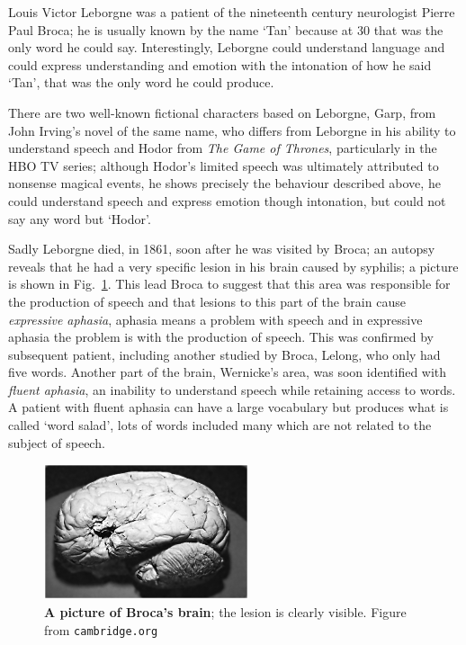\documentclass[12pt]{article}
\begin{document}
Louis Victor Leborgne was a patient of the nineteenth century
neurologist Pierre Paul Broca; he is usually known by the name `Tan'
because at 30 that was the only word he could say. Interestingly,
Leborgne could understand language and could express understanding and
emotion with the intonation of how he said `Tan', that was the only
word he could produce.

There are two well-known fictional characters based on Leborgne, Garp,
from John Irving's novel of the same name, who differs from Leborgne
in his ability to understand speech and Hodor from \textsl{The Game of
  Thrones}, particularly in the HBO TV series; although Hodor's
limited speech was ultimately attributed to nonsense magical events,
he shows precisely the behaviour described above, he could understand
speech and express emotion though intonation, but could not say any
word but `Hodor'.

Sadly Leborgne died, in 1861, soon after he was visited by Broca; an
autopsy reveals that he had a very specific lesion in his brain caused
by syphilis; a picture is shown in Fig.~\ref{fig_broca}. This lead
Broca to suggest that this area was responsible for the production of
speech and that lesions to this part of the brain cause
\textsl{expressive aphasia}, aphasia means a problem with speech and
in expressive aphasia the problem is with the production of
speech. This was confirmed by subsequent patient, including another
studied by Broca, Lelong, who only had five words. Another part of the
brain, Wernicke's area, was soon identified with \textsl{fluent
  aphasia}, an inability to understand speech while retaining access
to words. A patient with fluent aphasia can have a large vocabulary
but produces what is called `word salad', lots of words included many
which are not related to the subject of speech.

\begin{figure}[tbhp]
  \begin{center}
  \includegraphics[width=6cm]{broca.png}
\end{center}
  \caption{\textbf{A picture of Broca's brain}; the lesion is clearly visible. Figure from
    \texttt{cambridge.org}\label{fig_broca}}
\end{figure}
\end{document}
